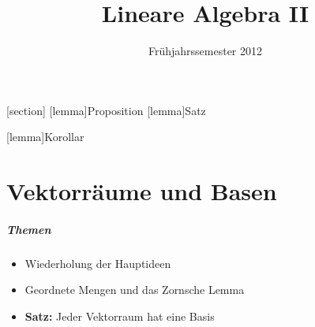 \setlength{\headheight}{15pt}
\setlength{\headsep}{0.8cm}

\setlength{\oddsidemargin}{2.5cm} \addtolength{\oddsidemargin}{-1in}
\setlength{\evensidemargin}{2.5cm} \addtolength{\evensidemargin}{-1in}

\setlength{\footskip}{\headsep}
\addtolength{\footskip}{\headheight}
\setlength{\topmargin}{\paperheight}
\addtolength{\topmargin}{-\textheight}
\addtolength{\topmargin}{-\headheight}
\addtolength{\topmargin}{-\headsep}
\addtolength{\topmargin}{-\footskip}
\addtolength{\topmargin}{-2in}
\addtolength{\topmargin}{-0.5\topmargin}


\setheadsepline{.4pt} 
\clearscrheadfoot

\ihead[\headmark]{\headmark}

\cfoot[\pagemark]{\pagemark}

\makeindex

\title{Lineare Algebra II}
\date{Frühjahrssemester 2012}
\author{ }

\usepackage{mdframed}
[section]
[lemma]{Proposition}
[lemma]{Satz}

[lemma]{Korollar}

\newcommand*\Zb[1] {\mathbb{#1}}
\newcommand*\f[1] {\textbf{#1}}

\newenvironment{amatrix}[1]{%
  \left(\begin{array}{@{}*{#1}{c}|c@{}}
}{%
  \end{array}\right)
}



\maketitle
\tableofcontents
\newpage

\chapter{Vektorräume und Basen}
\paragraph{Themen}
\begin{itemize}
 \item Wiederholung der Hauptideen
 \item Geordnete Mengen und das Zornsche Lemma
 \item \f{Satz:} Jeder Vektorraum hat eine Basis
\end{itemize}

